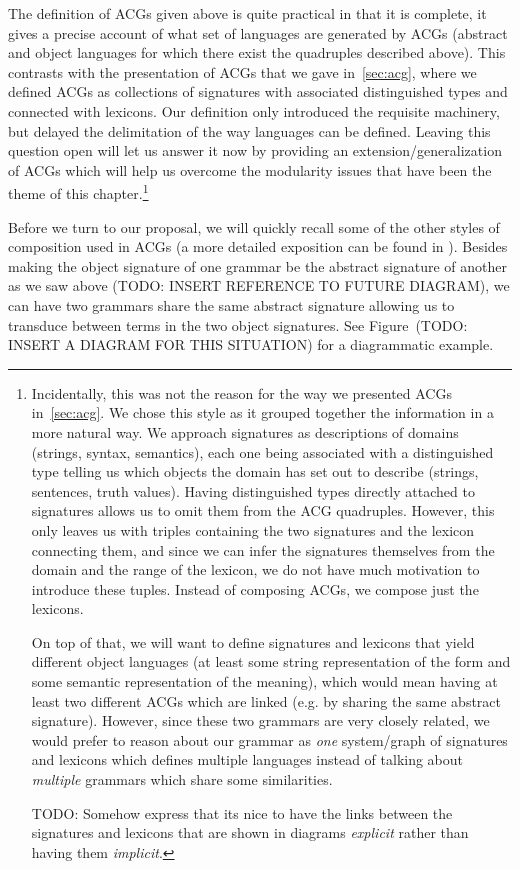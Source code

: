 The definition of ACGs given above is quite practical in that it is
complete, it gives a precise account of what set of languages are
generated by ACGs (abstract and object languages for which there exist
the quadruples described above). This contrasts with the presentation of
ACGs that we gave in~\ref{sec:acg}, where we defined ACGs as
collections of signatures with associated distinguished types and
connected with lexicons. Our definition only introduced the requisite
machinery, but delayed the delimitation of the way languages can be
defined. Leaving this question open will let us answer it now by
providing an extension/generalization of ACGs which will help us
overcome the modularity issues that have been the theme of this
chapter.\footnote{Incidentally, this was not the reason for the way we
  presented ACGs in~\ref{sec:acg}. We chose this style as it grouped
  together the information in a more natural way. We approach signatures
  as descriptions of domains (strings, syntax, semantics), each one
  being associated with a distinguished type telling us which objects
  the domain has set out to describe (strings, sentences, truth
  values). Having distinguished types directly attached to signatures
  allows us to omit them from the ACG quadruples. However, this only
  leaves us with triples containing the two signatures and the lexicon
  connecting them, and since we can infer the signatures themselves from
  the domain and the range of the lexicon, we do not have much
  motivation to introduce these tuples. Instead of composing ACGs, we
  compose just the lexicons.

On top of that, we will want to define signatures and lexicons that
yield different object languages (at least some string representation of
the form and some semantic representation of the meaning), which would
mean having at least two different ACGs which are linked (e.g. by
sharing the same abstract signature). However, since these two grammars
are very closely related, we would prefer to reason about our grammar as
\emph{one} system/graph of signatures and lexicons which defines
multiple languages instead of talking about \emph{multiple} grammars
which share some similarities.

TODO: Somehow express that its nice to have the links between the
signatures and lexicons that are shown in diagrams \emph{explicit}
rather than having them \emph{implicit}.}

Before we turn to our proposal, we will quickly recall some of the other
styles of composition used in ACGs (a more detailed exposition can be
found in \cite{pogodalla2012controlling}). Besides making the object
signature of one grammar be the abstract signature of another as we saw
above (TODO: INSERT REFERENCE TO FUTURE DIAGRAM), we can have two
grammars share the same abstract signature allowing us to transduce
between terms in the two object signatures. See Figure~(TODO: INSERT A
DIAGRAM FOR THIS SITUATION) for a diagrammatic example.

